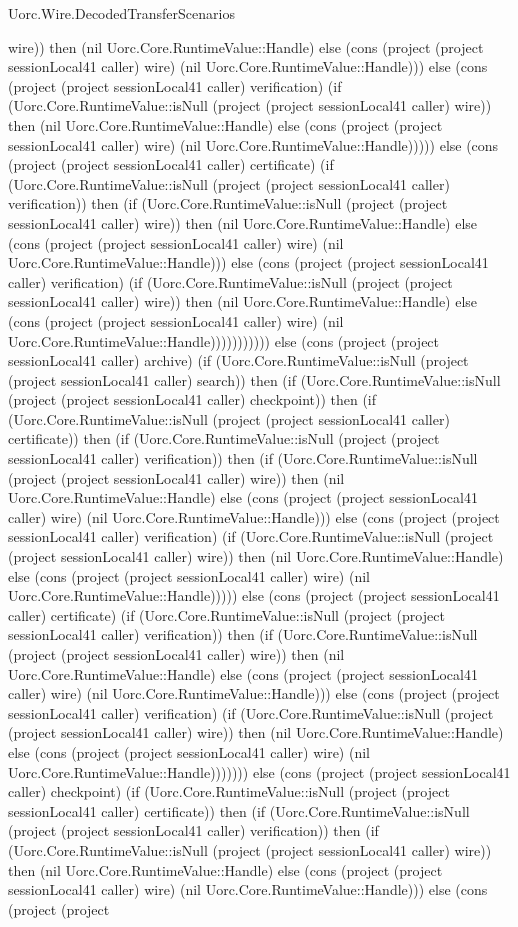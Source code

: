 \begin{lexlean}{Uorc.Wire.DecodedTransferScenarios}
\begin{semanticmodule}
{wire)) then (nil Uorc.Core.RuntimeValue::Handle) else (cons (project (project sessionLocal41 caller) wire) (nil Uorc.Core.RuntimeValue::Handle))) else (cons (project (project sessionLocal41 caller) verification) (if (Uorc.Core.RuntimeValue::isNull (project (project sessionLocal41 caller) wire)) then (nil Uorc.Core.RuntimeValue::Handle) else (cons (project (project sessionLocal41 caller) wire) (nil Uorc.Core.RuntimeValue::Handle))))) else (cons (project (project sessionLocal41 caller) certificate) (if (Uorc.Core.RuntimeValue::isNull (project (project sessionLocal41 caller) verification)) then (if (Uorc.Core.RuntimeValue::isNull (project (project sessionLocal41 caller) wire)) then (nil Uorc.Core.RuntimeValue::Handle) else (cons (project (project sessionLocal41 caller) wire) (nil Uorc.Core.RuntimeValue::Handle))) else (cons (project (project sessionLocal41 caller) verification) (if (Uorc.Core.RuntimeValue::isNull (project (project sessionLocal41 caller) wire)) then (nil Uorc.Core.RuntimeValue::Handle) else (cons (project (project sessionLocal41 caller) wire) (nil Uorc.Core.RuntimeValue::Handle))))))))))) else (cons (project (project sessionLocal41 caller) archive) (if (Uorc.Core.RuntimeValue::isNull (project (project sessionLocal41 caller) search)) then (if (Uorc.Core.RuntimeValue::isNull (project (project sessionLocal41 caller) checkpoint)) then (if (Uorc.Core.RuntimeValue::isNull (project (project sessionLocal41 caller) certificate)) then (if (Uorc.Core.RuntimeValue::isNull (project (project sessionLocal41 caller) verification)) then (if (Uorc.Core.RuntimeValue::isNull (project (project sessionLocal41 caller) wire)) then (nil Uorc.Core.RuntimeValue::Handle) else (cons (project (project sessionLocal41 caller) wire) (nil Uorc.Core.RuntimeValue::Handle))) else (cons (project (project sessionLocal41 caller) verification) (if (Uorc.Core.RuntimeValue::isNull (project (project sessionLocal41 caller) wire)) then (nil Uorc.Core.RuntimeValue::Handle) else (cons (project (project sessionLocal41 caller) wire) (nil Uorc.Core.RuntimeValue::Handle))))) else (cons (project (project sessionLocal41 caller) certificate) (if (Uorc.Core.RuntimeValue::isNull (project (project sessionLocal41 caller) verification)) then (if (Uorc.Core.RuntimeValue::isNull (project (project sessionLocal41 caller) wire)) then (nil Uorc.Core.RuntimeValue::Handle) else (cons (project (project sessionLocal41 caller) wire) (nil Uorc.Core.RuntimeValue::Handle))) else (cons (project (project sessionLocal41 caller) verification) (if (Uorc.Core.RuntimeValue::isNull (project (project sessionLocal41 caller) wire)) then (nil Uorc.Core.RuntimeValue::Handle) else (cons (project (project sessionLocal41 caller) wire) (nil Uorc.Core.RuntimeValue::Handle))))))) else (cons (project (project sessionLocal41 caller) checkpoint) (if (Uorc.Core.RuntimeValue::isNull (project (project sessionLocal41 caller) certificate)) then (if (Uorc.Core.RuntimeValue::isNull (project (project sessionLocal41 caller) verification)) then (if (Uorc.Core.RuntimeValue::isNull (project (project sessionLocal41 caller) wire)) then (nil Uorc.Core.RuntimeValue::Handle) else (cons (project (project sessionLocal41 caller) wire) (nil Uorc.Core.RuntimeValue::Handle))) else (cons (project (project }
\end{semanticmodule}
\end{lexlean}
